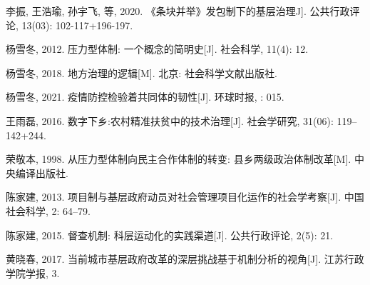 \documentclass[
  12pt,
]{ctexart}
\newlength{\cslhangindent}
\newlength{\cslentryspacingunit} %
\newenvironment{CSLReferences}[2] %
 {%
  \setlength{\parindent}{0pt}
  \ifodd #1
  \let\oldpar\par
  \def\par{\hangindent=\cslhangindent\oldpar}
  \fi
  \setlength{\parskip}{#2\cslentryspacingunit}
 }%
 {}
\begin{document}
\begin{CSLReferences}{1}{0}
\leavevmode{}%
李振, 王浩瑜, 孙宇飞, 等, 2020. {《条块并举》}发包制下的基层治理\textemdash\textemdash{{以T区乡镇政府的精准扶贫工作为例}}{[}J{]}. 公共行政评论, 13(03): 102-117+196-197.

\leavevmode{}%
杨雪冬, 2012. 压力型体制: 一个概念的简明史{[}J{]}. 社会科学, 11(4): 12.

\leavevmode{}%
杨雪冬, 2018. {地方治理的逻辑}{[}M{]}. {北京}: {社会科学文献出版社}.

\leavevmode{}%
杨雪冬, 2021. 疫情防控检验着共同体的韧性{[}J{]}. 环球时报, : 015.

\leavevmode{}%
王雨磊, 2016. 数字下乡:农村精准扶贫中的技术治理{[}J{]}. 社会学研究, 31(06): 119--142+244.

\leavevmode{}%
荣敬本, 1998. 从压力型体制向民主合作体制的转变: 县乡两级政治体制改革{[}M{]}. {中央编译出版社}.

\leavevmode{}%
陈家建, 2013. 项目制与基层政府动员\textemdash\textemdash 对社会管理项目化运作的社会学考察{[}J{]}. 中国社会科学, 2: 64--79.

\leavevmode{}%
陈家建, 2015. 督查机制: 科层运动化的实践渠道{[}J{]}. 公共行政评论, 2(5): 21.

\leavevmode{}%
黄晓春, 2017. 当前城市基层政府改革的深层挑战\textemdash\textemdash 基于机制分析的视角{[}J{]}. 江苏行政学院学报, 3.

\end{CSLReferences}
\end{document}
